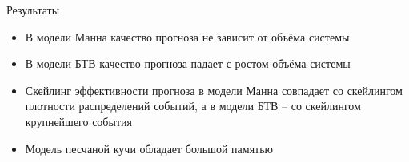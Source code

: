 \documentclass{beamer}
\begin{document}
	\begin{frame}{Результаты}
		\begin{itemize}
			\item<1-> В модели Манна качество прогноза не зависит от объёма системы
			\item<2-> В модели БТВ качество прогноза падает с ростом объёма системы
			\item<3-> Скейлинг эффективности прогноза в модели Манна совпадает со скейлингом плотности распределений событий, а в модели БТВ -- со скейлингом крупнейшего события
			\item<4-> Модель песчаной кучи обладает большой памятью
		\end{itemize}

		\note{}
	\end{frame}

	
\end{document}

